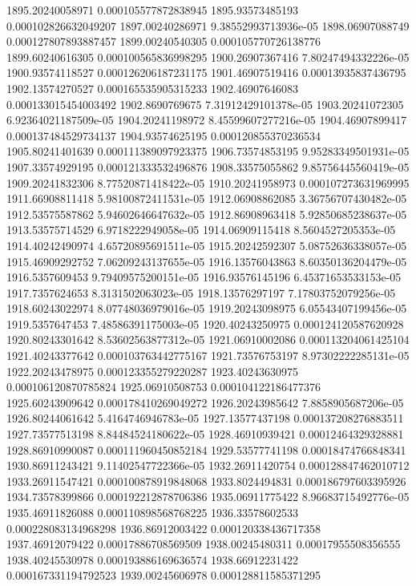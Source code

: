 {1895.20240058971 0.000105577872838945
1895.93573485193 0.000102826632049207
1897.00240286971 9.38552993713936e-05
1898.06907088749 0.000127807893887457
1899.00240540305 0.000105770726138776
1899.60240616305 0.000100565836998295
1900.26907367416 7.80247494332226e-05
1900.93574118527 0.000126206187231175
1901.46907519416 0.00013935837436795
1902.13574270527 0.000165535905315233
1902.46907646083 0.000133015454003492
1902.8690769675 7.31912429101378e-05
1903.20241072305 6.92364021187509e-05
1904.20241198972 8.45599607277216e-05
1904.46907899417 0.000137484529734137
1904.93574625195 0.000120855370236534
1905.80241401639 0.000111389097923375
1906.73574853195 9.95283349501931e-05
1907.33574929195 0.000121333532496876
1908.33575055862 9.85756445560419e-05
1909.20241832306 8.77520871418422e-05
1910.20241958973 0.000107273631969995
1911.66908811418 5.98100872411531e-05
1912.06908862085 3.36756707430482e-05
1912.53575587862 5.94602646647632e-05
1912.86908963418 5.92850685238637e-05
1913.53575714529 6.9718222949058e-05
1914.06909115418 8.5604527205353e-05
1914.40242490974 4.65720895691511e-05
1915.20242592307 5.08752636338057e-05
1915.46909292752 7.06209243137655e-05
1916.13576043863 8.60350136204479e-05
1916.5357609453 9.79409575200151e-05
1916.93576145196 6.45371653533153e-05
1917.7357624653 8.3131502063023e-05
1918.13576297197 7.17803752079256e-05
1918.60243022974 8.07748036979016e-05
1919.20243098975 6.05543407199456e-05
1919.5357647453 7.48586391175003e-05
1920.40243250975 0.000124120587620928
1920.80243301642 8.53602563877312e-05
1921.06910002086 0.000113204061425104
1921.40243377642 0.000103763442775167
1921.73576753197 8.97302222285131e-05
1922.20243478975 0.000123355279220287
1923.40243630975 0.000106120870785824
1925.06910508753 0.000104122186477376
1925.60243909642 0.000178410269049272
1926.20243985642 7.8858905687206e-05
1926.80244061642 5.4164746946783e-05
1927.13577437198 0.000137208276883511
1927.73577513198 8.84484524180622e-05
1928.46910939421 0.00012464329328881
1928.86910990087 0.000111960450852184
1929.53577741198 0.00018474766848341
1930.86911243421 9.11402547722366e-05
1932.26911420754 0.000128847462010712
1933.26911547421 0.000100878919848068
1933.8024494831 0.000186797603395926
1934.73578399866 0.000192212878706386
1935.06911775422 8.96683715492776e-05
1935.46911826088 0.000110898568768225
1936.33578602533 0.000228083134968298
1936.86912003422 0.000120338436717358
1937.46912079422 0.00017886708569509
1938.00245480311 0.00017955508356555
1938.40245530978 0.000193886169636574
1938.66912231422 0.000167331194792523
1939.00245606978 0.000128811585371295
}
